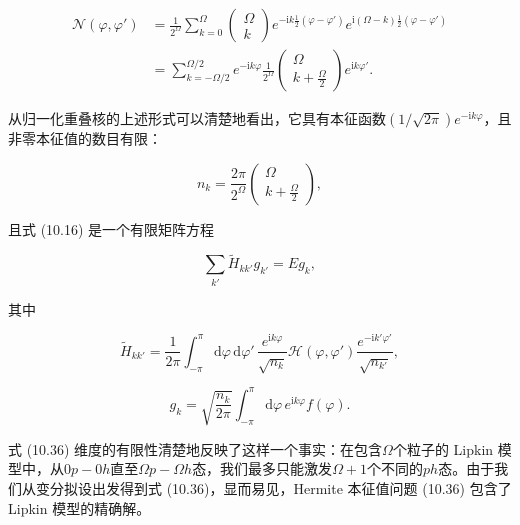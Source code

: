 \begin{align}
\mathscr{N}(\varphi,\varphi') & =\frac{1}{2^{\Omega}}\sum^{\Omega}_{k=0}\begin{pmatrix}\Omega\\
k
\end{pmatrix}e^{-\mathrm{i}k\frac{1}{2}(\varphi-\varphi')}e^{\mathrm{i}(\Omega-k)\frac{1}{2}(\varphi-\varphi')}\nonumber \\
 & =\sum^{\Omega/2}_{k=-\Omega/2}e^{-\mathrm{i}k\varphi}\frac{1}{2^{\Omega}}\begin{pmatrix}\Omega\\
k+\frac{\Omega}{2}
\end{pmatrix}e^{\mathrm{i}k\varphi'}.\label{eq:lipkin_norm_binomial}
\end{align}

从归一化重叠核的上述形式可以清楚地看出，它具有本征函数$(1/\sqrt{2\pi})e^{-\mathrm{i}k\varphi}$，且非零本征值的数目有限：

\begin{equation}
n_{k}=\frac{2\pi}{2^{\Omega}}\begin{pmatrix}\Omega\\
k+\frac{\Omega}{2}
\end{pmatrix},\label{eq:lipkin_norm_eigenvalues}
\end{equation}

且式 (10.16) 是一个有限矩阵方程

\begin{equation}
\sum_{k'}\tilde{H}_{kk'}g_{k'}=Eg_{k},\label{eq:lipkin_finite_matrix_eq}
\end{equation}

其中

\begin{equation}
\tilde{H}_{kk'}=\frac{1}{2\pi}\int^{\pi}_{-\pi}\mathrm{d}\varphi\,\mathrm{d}\varphi'\,\frac{e^{\mathrm{i}k\varphi}}{\sqrt{n_{k}}}\mathscr{H}(\varphi,\varphi')\frac{e^{-\mathrm{i}k'\varphi'}}{\sqrt{n_{k'}}},\label{eq:lipkin_h_tilde_matrix}
\end{equation}

\begin{equation}
g_{k}=\sqrt{\frac{n_{k}}{2\pi}}\int^{\pi}_{-\pi}\mathrm{d}\varphi\,e^{\mathrm{i}k\varphi}f(\varphi).\label{eq:lipkin_gk_def}
\end{equation}

式 (10.36) 维度的有限性清楚地反映了这样一个事实：在包含$\Omega$个粒子的 Lipkin 模型中，从$0p-0h$直至$\Omega p-\Omega h$态，我们最多只能激发$\Omega+1$个不同的$ph$态。由于我们从变分拟设出发得到式
(10.36)，显而易见，Hermite 本征值问题 (10.36) 包含了 Lipkin 模型的精确解。


